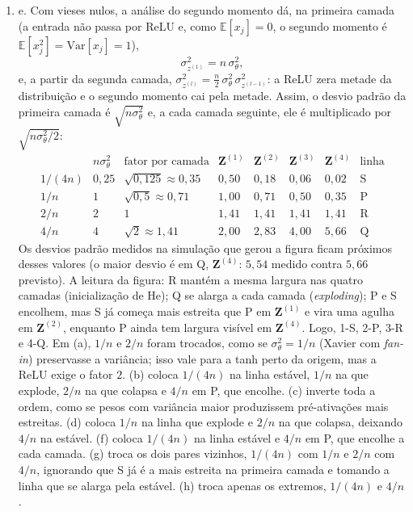 \documentclass{dlproblemset}
\begin{document}
\begin{enumerate}[1)]
    \item e. Com vieses nulos, a análise do segundo momento dá, na primeira camada (a entrada não passa por ReLU e, como $\mathbb{E}[x_j] = 0$, o segundo momento é $\mathbb{E}[x_j^2] = \mathrm{Var}[x_j] = 1$),
    \[
    \sigma^2_{z^{(1)}} = n\,\sigma_\theta^2 ,
    \]
    e, a partir da segunda camada, $\sigma^2_{z^{(l)}} = \tfrac{n}{2}\,\sigma_\theta^2\,\sigma^2_{z^{(l-1)}}$: a ReLU zera metade da distribuição e o segundo momento cai pela metade. Assim, o desvio padrão da primeira camada é $\sqrt{n\sigma_\theta^2}$ e, a cada camada seguinte, ele é multiplicado por $\sqrt{n\sigma_\theta^2/2}$:
    \[
    \begin{array}{c|c|c|cccc|c}
     & n\sigma_\theta^2 & \text{fator por camada} & \mathbf{Z}^{(1)} & \mathbf{Z}^{(2)} & \mathbf{Z}^{(3)} & \mathbf{Z}^{(4)} & \text{linha}\\\hline
    1/(4n) & 0{,}25 & \sqrt{0{,}125} \approx 0{,}35 & 0{,}50 & 0{,}18 & 0{,}06 & 0{,}02 & \text{S}\\
    1/n & 1 & \sqrt{0{,}5} \approx 0{,}71 & 1{,}00 & 0{,}71 & 0{,}50 & 0{,}35 & \text{P}\\
    2/n & 2 & 1 & 1{,}41 & 1{,}41 & 1{,}41 & 1{,}41 & \text{R}\\
    4/n & 4 & \sqrt{2} \approx 1{,}41 & 2{,}00 & 2{,}83 & 4{,}00 & 5{,}66 & \text{Q}
    \end{array}
    \]
    Os desvios padrão medidos na simulação que gerou a figura ficam próximos desses valores (o maior desvio é em Q, $\mathbf{Z}^{(4)}$: $5{,}54$ medido contra $5{,}66$ previsto). A leitura da figura: R mantém a mesma largura nas quatro camadas (inicialização de He); Q se alarga a cada camada (\textit{exploding}); P e S encolhem, mas S já começa mais estreita que P em $\mathbf{Z}^{(1)}$ e vira uma agulha em $\mathbf{Z}^{(2)}$, enquanto P ainda tem largura visível em $\mathbf{Z}^{(4)}$. Logo, 1-S, 2-P, 3-R e 4-Q. Em (a), $1/n$ e $2/n$ foram trocados, como se $\sigma_\theta^2 = 1/n$ (Xavier com \textit{fan-in}) preservasse a variância; isso vale para a tanh perto da origem, mas a ReLU exige o fator $2$. (b) coloca $1/(4n)$ na linha estável, $1/n$ na que explode, $2/n$ na que colapsa e $4/n$ em P, que encolhe. (c) inverte toda a ordem, como se pesos com variância maior produzissem pré-ativações mais estreitas. (d) coloca $1/n$ na linha que explode e $2/n$ na que colapsa, deixando $4/n$ na estável. (f) coloca $1/(4n)$ na linha estável e $4/n$ em P, que encolhe a cada camada. (g) troca os dois pares vizinhos, $1/(4n)$ com $1/n$ e $2/n$ com $4/n$, ignorando que S já é a mais estreita na primeira camada e tomando a linha que se alarga pela estável. (h) troca apenas os extremos, $1/(4n)$ e $4/n$.
\end{enumerate}
\end{document}
